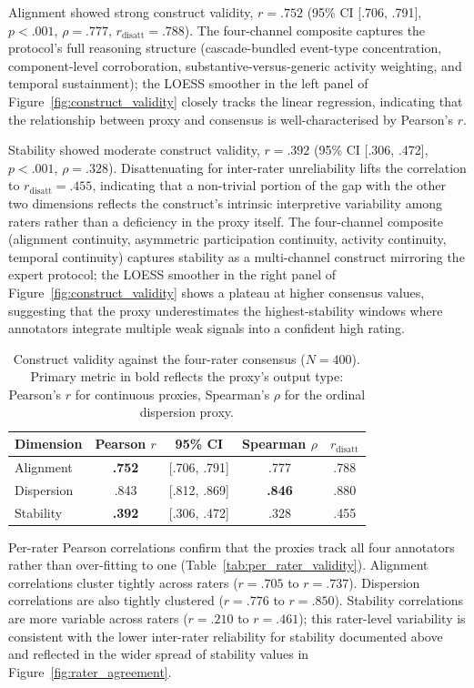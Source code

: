 \documentclass[preprint,12pt,authoryear]{elsarticle}
\begin{document}
Alignment showed strong construct validity, $r = .752$ (95\% CI [.706, .791], $p < .001$, $\rho = .777$, $r_{\mathrm{disatt}} = .788$). The four-channel composite captures the protocol's full reasoning structure (cascade-bundled event-type concentration, component-level corroboration, substantive-versus-generic activity weighting, and temporal sustainment); the LOESS smoother in the left panel of Figure~\ref{fig:construct_validity} closely tracks the linear regression, indicating that the relationship between proxy and consensus is well-characterised by Pearson's $r$.

Stability showed moderate construct validity, $r = .392$ (95\% CI [.306, .472], $p < .001$, $\rho = .328$). Disattenuating for inter-rater unreliability lifts the correlation to $r_{\mathrm{disatt}} = .455$, indicating that a non-trivial portion of the gap with the other two dimensions reflects the construct's intrinsic interpretive variability among raters rather than a deficiency in the proxy itself. The four-channel composite (alignment continuity, asymmetric participation continuity, activity continuity, temporal continuity) captures stability as a multi-channel construct mirroring the expert protocol; the LOESS smoother in the right panel of Figure~\ref{fig:construct_validity} shows a plateau at higher consensus values, suggesting that the proxy underestimates the highest-stability windows where annotators integrate multiple weak signals into a confident high rating.

\begin{table}[h]
\centering
\caption{Construct validity against the four-rater consensus ($N = 400$). Primary metric in bold reflects the proxy's output type: Pearson's $r$ for continuous proxies, Spearman's $\rho$ for the ordinal dispersion proxy.}
\label{tab:validity}
\begin{tabular}{lcccc}
\hline
Dimension & Pearson $r$ & 95\% CI & Spearman $\rho$ & $r_{\mathrm{disatt}}$ \\
\hline
Alignment & \textbf{.752} & [.706, .791] & .777 & .788 \\
Dispersion & .843 & [.812, .869] & \textbf{.846} & .880 \\
Stability & \textbf{.392} & [.306, .472] & .328 & .455 \\
\hline
\end{tabular}
\end{table}

Per-rater Pearson correlations confirm that the proxies track all four annotators rather than over-fitting to one (Table~\ref{tab:per_rater_validity}). Alignment correlations cluster tightly across raters ($r = .705$ to $r = .737$). Dispersion correlations are also tightly clustered ($r = .776$ to $r = .850$). Stability correlations are more variable across raters ($r = .210$ to $r = .461$); this rater-level variability is consistent with the lower inter-rater reliability for stability documented above and reflected in the wider spread of stability values in Figure~\ref{fig:rater_agreement}.
\end{document}
